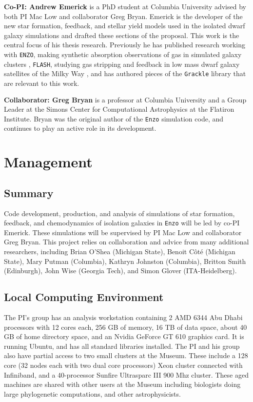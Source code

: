 \documentclass[11pt]{article}
\begin{document}
\textbf{Co-PI: Andrew Emerick} is a PhD student at Columbia University advised by both PI Mac Low and collaborator Greg Bryan. Emerick is the developer of the new star formation, feedback, and stellar yield models used in the isolated dwarf galaxy simulations and drafted these sections of the proposal. This work is the central focus of his thesis research. Previously he has published research working with \texttt{ENZO}, making synthetic absorption observations of gas in simulated galaxy clusters \citep{Emerick2015}, \texttt{FLASH}, studying gas stripping and feedback in low mass dwarf galaxy satellites of the Milky Way \citep{Emerick2016}, and has authored pieces of the \texttt{Grackle} library \citep{Grackle} that are relevant to this work.

\textbf{Collaborator: Greg Bryan} is a professor at Columbia University and a Group Leader at the Simons Center for Computational Astrophysics at the Flatiron Institute. Bryan was the original author of the \texttt{Enzo} simulation code, and continues to play an active role in its development. %

\section{Management}

\subsection{Summary}

Code development, production, and analysis of simulations of star formation, feedback, and chemodynamics of isolation galaxies in \texttt{Enzo} will be led by co-PI Emerick. These simulations will be supervised by PI Mac Low and collaborator Greg Bryan. This project relies on collaboration and advice from many additional researchers, including Brian O'Shea (Michigan State), Benoit C{\^o}t{\'e} (Michigan State), Mary Putman (Columbia), Kathryn Johnston (Columbia), Britton Smith (Edinburgh), John Wise (Georgia Tech), and Simon Glover (ITA-Heidelberg).

\subsection{Local Computing Environment}

The PI's group has an analysis workstation containing  2 AMD 6344 Abu Dhabi processors with 12 cores each, 256 GB of memory, 16 TB of data space, about 40 GB of home directory space, and an Nvidia GeForce GT 610 graphics card. It is running Ubuntu, and has all standard libraries installed.  The PI and his group also have partial access to two small clusters at the Museum. These include a 128 core (32 nodes each with two dual core processors) Xeon cluster connected with Infiniband, and a 40-processor Sunfire Ultrasparc III 900 Mhz cluster. These aged machines are shared with other users at the Museum including biologists doing large phylogenetic computations, and other astrophysicists.
\end{document}
